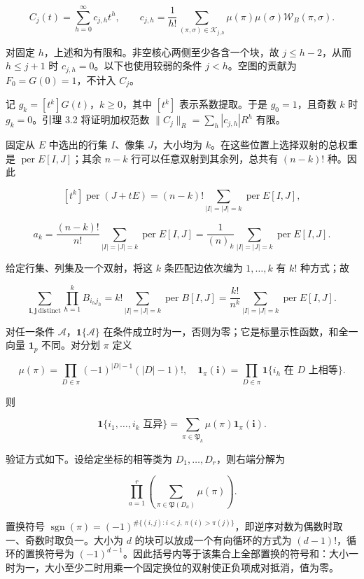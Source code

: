\documentclass[11pt,a4paper]{article}
\begin{document}
\[
C_j(t)=\sum_{h=0}^{\infty}c_{j,h}t^h,\qquad
c_{j,h}=\frac1{h!}\sum_{(\pi,\sigma)\in\mathcal K_{j,h}}
\mu(\pi)\mu(\sigma)\mathcal W_B(\pi,\sigma).
\]

对固定 \(h\)，上述和为有限和。非空核心两侧至少各含一个块，故 \(j\le h-2\)，从而 \(h\le j+1\) 时 \(c_{j,h}=0\)。以下也使用较弱的条件 \(j<h\)。空图的贡献为 \(F_0=G(0)=1\)，不计入 \(C_j\)。

记 \(g_k=[t^k]G(t)\)，\(k\ge0\)，其中 \([t^k]\) 表示系数提取。于是 \(g_0=1\)，且奇数 \(k\) 时 \(g_k=0\)。引理 3.2 将证明加权范数 \(\|C_j\|_R=\sum_h|c_{j,h}|R^h\) 有限。

固定从 \(E\) 中选出的行集 \(I\)、像集 \(J\)，大小均为 \(k\)。在这些位置上选择双射的总权重是 \(\operatorname{per}E[I,J]\)；其余 \(n-k\) 行可以任意双射到其余列，总共有 \((n-k)!\) 种。因此

\[
[t^k]\operatorname{per}(J+tE)
=(n-k)!\sum_{|I|=|J|=k}\operatorname{per}E[I,J],
\]

\[
a_k=\frac{(n-k)!}{n!}\sum_{|I|=|J|=k}\operatorname{per}E[I,J]
=\frac1{(n)_k}\sum_{|I|=|J|=k}\operatorname{per}E[I,J].
\]

给定行集、列集及一个双射，将这 \(k\) 条匹配边依次编为 \(1,\ldots,k\) 有 \(k!\) 种方式；故

\[
\sum_{\boldsymbol i,\boldsymbol j\ \mathrm{distinct}}\prod_{h=1}^kB_{i_hj_h}
=k!\sum_{|I|=|J|=k}\operatorname{per}B[I,J]
=\frac{k!}{n^k}\sum_{|I|=|J|=k}\operatorname{per}E[I,J].
\]

对任一条件 \(\mathcal A\)，\(\mathbf1\{\mathcal A\}\) 在条件成立时为一，否则为零；它是标量示性函数，和全一向量 \(\mathbf1_p\) 不同。对分划 \(\pi\) 定义

\[
\mu(\pi)=\prod_{D\in\pi}(-1)^{|D|-1}(|D|-1)!,\quad
\mathbf1_\pi(\boldsymbol i)=\prod_{D\in\pi}\mathbf1\{i_h\text{ 在 }D\text{ 上相等}\}.
\]

则

\[
\mathbf1\{i_1,\ldots,i_k\text{ 互异}\}
=\sum_{\pi\in\mathfrak P_k}\mu(\pi)\mathbf1_\pi(\boldsymbol i).
\]

验证方式如下。设给定坐标的相等类为 \(D_1,\ldots,D_r\)，则右端分解为

\[
\prod_{a=1}^r\left(\sum_{\pi\in\mathfrak P(D_a)}\mu(\pi)\right).
\]

置换符号 \(\operatorname{sgn}(\pi)=(-1)^{\#\{(i,j):i<j,\ \pi(i)>\pi(j)\}}\)，即逆序对数为偶数时取一、奇数时取负一。大小为 \(d\) 的块可以放成一个有向循环的方式为 \((d-1)!\)，循环的置换符号为 \((-1)^{d-1}\)。因此括号内等于该集合上全部置换的符号和：大小一时为一，大小至少二时用乘一个固定换位的双射使正负项成对抵消，值为零。
\end{document}

